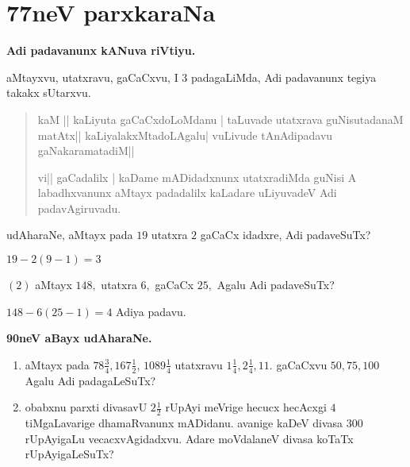 \chapter{77neV parxkaraNa}

\begin{center}
{\bf\large Adi padavanunx kANuva riVtiyu.}
\end{center}

aMtayxvu, utatxravu, gaCaCxvu, I $3$ padagaLiMda, Adi padavanunx tegiya takakx sUtarxvu.

\begin{verse}
kaM || kaLiyuta gaCaCxdoLoMdanu | taLuvade utatxrava guNisutadanaM matAtx|| kaLiyalakxMtadoLAgalu| vuLivude tAnAdipadavu gaNakaramatadiM||

vi|| gaCadalilx | kaDame mADidadxnunx utatxradiMda guNisi A labadhxvanunx aMtayx padadalilx kaLadare uLiyuvadeV Adi padavAgiruvadu.
\end{verse}

udAharaNe, aMtayx pada $19$ utatxra $2$ gaCaCx idadxre, Adi padaveSuTx?

\qq $19-2 (9-1)=3$

$(2)$ aMtayx $148,$ utatxra $6,$ gaCaCx $25,$ Agalu Adi padaveSuTx?

\qq$148-6 (25-1)=4$ Adiya padavu.

\begin{center}
{\bf\large 90neV aBayx udAharaNe.}
\end{center}

\begin{enumerate}[\rm (1)]
\item aMtayx pada $78\tfrac{3}{4}, 167\tfrac{1}{2}$, $1089\tfrac{1}{4}$ utatxravu $1\tfrac{1}{4}, 2\tfrac{1}{4}, 11.$ gaCaCxvu $50, 75, 100$ Agalu Adi padagaLeSuTx?

\item obabxnu parxti divasavU $2\tfrac{1}{2}$ rUpAyi meVrige hecucx hecAcxgi $4$ tiMgaLavarige dhamaRvanunx mADidanu. avanige kaDeV divasa $300$ rUpAyigaLu vecacxvAgidadxvu. Adare moVdalaneV divasa koTaTx rUpAyigaLeSuTx?
\end{enumerate}

